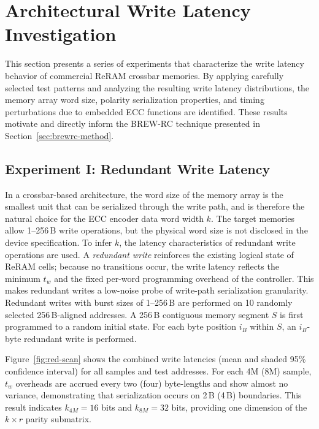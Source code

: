 \section{Architectural Write Latency Investigation}

\label{sec:brewrc-investigation}

This section presents a series of experiments that characterize the
write latency behavior of commercial ReRAM crossbar memories. By
applying carefully selected test patterns and analyzing the resulting
write latency distributions, the memory array word size, polarity
serialization properties, and timing perturbations due to embedded ECC
functions are identified. These results motivate and directly inform the
BREW-RC technique presented in Section~\ref{sec:brewrc-method}.

\subsection{Experiment I: Redundant Write Latency}
\label{sec:brewrc-exp1} In a crossbar-based architecture, the word size
of the memory array is the smallest unit that can be serialized through
the write path, and is therefore the natural choice for the ECC encoder
data word width $k$. The target memories allow 1--256\,B write
operations, but the physical word size is not disclosed in the device
specification. To infer $k$, the latency characteristics of redundant
write operations are used. A \emph{redundant write} reinforces the
existing logical state of ReRAM cells; because no transitions occur, the
write latency reflects the minimum $t_w$ and the fixed per-word
programming overhead of the controller. This makes redundant writes a
low-noise probe of write-path serialization granularity. Redundant
writes with burst sizes of 1--256\,B are performed on 10 randomly
selected 256\,B-aligned addresses. A 256\,B contiguous memory segment
$S$ is first programmed to a random initial state. For each byte
position $i_B$ within $S$, an $i_B$-byte redundant write is performed.

Figure~\ref{fig:red-scan} shows the combined write latencies (mean and
shaded 95\% confidence interval) for all samples and test addresses. For
each 4M (8M) sample, $t_w$ overheads are accrued every two (four)
byte-lengths and show almost no variance, demonstrating that
serialization occurs on 2\,B (4\,B) boundaries. This result indicates
$k_{4M}=16$ bits and $k_{8M}=32$ bits, providing one dimension of the $k
	\times r$ parity submatrix.

